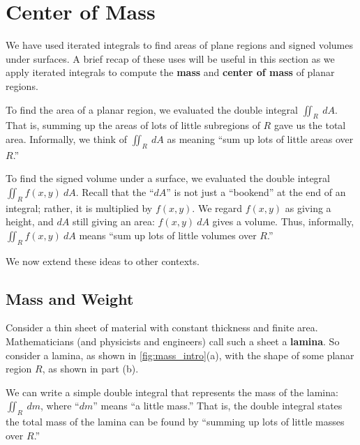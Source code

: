 \section{Center of Mass}\label{sec:center_of_mass}

We have used iterated integrals to find areas of plane regions and signed volumes under surfaces. A brief recap of these uses will be useful in this section as we apply iterated integrals to compute the \textbf{mass} and \textbf{center of mass} of planar regions.

To find the area of a planar region, we evaluated the double integral $\iint_R\ dA$. That is, summing up the areas of lots of little subregions of $R$ gave us the total area. Informally, we think of $\iint_R\ dA$ as meaning ``sum up lots of little areas over $R$.''

To find the signed volume under a surface, we evaluated the double integral $\iint_R f(x,y)\ dA$. Recall that the ``$dA$'' is not just a ``bookend'' at the end of an integral; rather, it is multiplied by $f(x,y)$. We regard $f(x,y)$ as giving a height, and $dA$ still giving an area: $f(x,y)\ dA$ gives a volume. Thus, informally, $\iint_Rf(x,y)\ dA$ means ``sum up lots of little volumes over $R$.''

We now extend these ideas to other contexts.

\subsection*{Mass and Weight}

Consider a thin sheet of material with constant thickness and finite area. Mathematicians (and physicists and engineers) call such a sheet a \textbf{lamina}. So consider a lamina, as shown in \autoref{fig:mass_intro}(a),  with the shape of some planar region $R$, as shown in part (b).

We can write a simple double integral that represents the mass of the lamina: $\iint_R\ dm$, where ``$dm$'' means ``a little mass.'' That is, the double integral states the total mass of the lamina can be found by ``summing up lots of little masses over $R$.''

